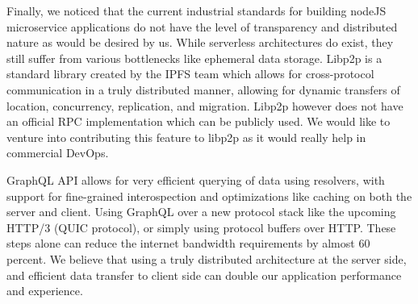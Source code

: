 Finally, we noticed that the current industrial standards for building nodeJS microservice applications do not have the level of transparency and 
distributed nature as would be desired by us. While serverless architectures do exist, they still suffer from various bottlenecks like ephemeral 
data storage. Libp2p is a standard library created by the IPFS team which allows for cross-protocol communication in a truly distributed manner, 
allowing for dynamic transfers of location, concurrency, replication, and migration. Libp2p however does not have an official RPC implementation 
which can be publicly used. We would like to venture into contributing this feature to libp2p as it would really help in commercial DevOps.

GraphQL API allows for very efficient querying of data using resolvers, with support for fine-grained interospection and optimizations like caching 
on both the server and client. Using GraphQL over a new protocol stack like the upcoming HTTP/3 (QUIC protocol), or simply using protocol buffers over 
HTTP. These steps alone can reduce the internet bandwidth requirements by almost 60 percent. We believe that using a truly distributed architecture at the 
server side, and efficient data transfer to client side can double our application performance and experience.